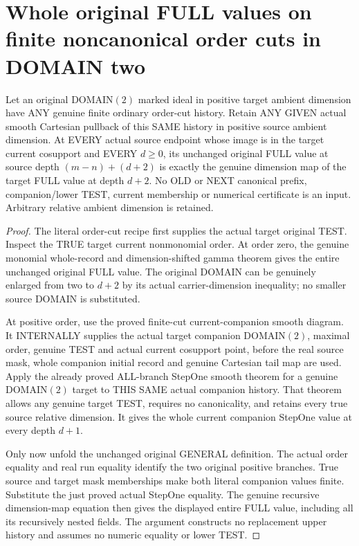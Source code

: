 \section{Whole original FULL values on finite noncanonical order cuts in DOMAIN two}

\begin{theorem}
\label{hir:original-finite-order-cut-domain-two-full-smooth-values}
\leanok
Let an original DOMAIN$(2)$ marked ideal in positive target ambient
dimension have ANY genuine finite ordinary order-cut history. Retain ANY
GIVEN actual smooth Cartesian pullback of this SAME history in positive
source ambient dimension. At EVERY actual source endpoint whose image is
in the target current cosupport and EVERY $d\ge0$, its unchanged original
FULL value at source depth $(m-n)+(d+2)$ is exactly the genuine dimension
map of the target FULL value at depth $d+2$. No OLD or NEXT canonical
prefix, companion/lower TEST, current membership or numerical certificate
is an input. Arbitrary relative ambient dimension is retained.
\end{theorem}
\begin{proof}
The literal order-cut recipe first supplies the actual target original
TEST. Inspect the TRUE target current nonmonomial order. At order zero,
the genuine monomial whole-record and dimension-shifted gamma theorem
gives the entire unchanged original FULL value. The original DOMAIN can
be genuinely enlarged from two to $d+2$ by its actual carrier-dimension
inequality; no smaller source DOMAIN is substituted.

At positive order, use the proved finite-cut current-companion smooth
diagram. It INTERNALLY supplies the actual target companion DOMAIN$(2)$,
maximal order, genuine TEST and actual current cosupport point, before the
real source mask, whole companion initial record and genuine Cartesian
tail map are used. Apply the already proved ALL-branch StepOne smooth
theorem for a genuine DOMAIN$(2)$ target to THIS SAME actual companion
history. That theorem allows any genuine target TEST, requires no
canonicality, and retains every true source relative dimension. It gives
the whole current companion StepOne value at every depth $d+1$.

Only now unfold the unchanged original GENERAL definition. The actual
order equality and real run equality identify the two original positive
branches. True source and target mask memberships make both literal
companion values finite. Substitute the just proved actual StepOne
equality. The genuine recursive dimension-map equation then gives the
displayed entire FULL value, including all its recursively nested fields.
The argument constructs no replacement upper history and assumes no
numeric equality or lower TEST.
\end{proof}

